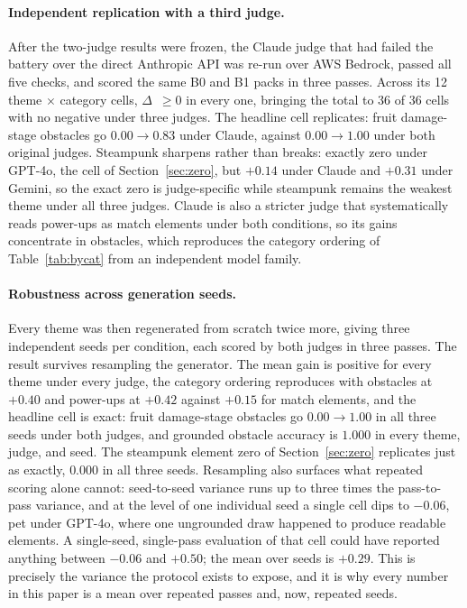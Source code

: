 \documentclass{article}
\newcommand{\D}{\ensuremath{\Delta}}
\begin{document}
\paragraph{Independent replication with a third judge.} After the two-judge results were frozen,
the Claude judge that had failed the battery over the direct Anthropic API was re-run over AWS
Bedrock, passed all five checks, and scored the same B0 and B1 packs in three passes. Across its 12
theme $\times$ category cells, \D~$\geq 0$ in every one, bringing the total to 36 of 36 cells with
no negative under three judges. The headline cell replicates: fruit damage-stage obstacles go
$0.00 \to 0.83$ under Claude, against $0.00 \to 1.00$ under both original judges. Steampunk
sharpens rather than breaks: exactly zero under GPT-4o, the cell of Section~\ref{sec:zero}, but
$+0.14$ under Claude and $+0.31$ under Gemini, so the exact zero is judge-specific while steampunk
remains the weakest theme under all three judges. Claude is also a stricter judge that
systematically reads power-ups as match elements under both conditions, so its gains concentrate in
obstacles, which reproduces the category ordering of Table~\ref{tab:bycat} from an independent
model family.

\paragraph{Robustness across generation seeds.} Every theme was then regenerated from scratch
twice more, giving three independent seeds per condition, each scored by both judges in three
passes. The result survives resampling the generator. The mean gain is positive for every theme
under every judge, the category ordering reproduces with obstacles at $+0.40$ and power-ups at
$+0.42$ against $+0.15$ for match elements, and the headline cell is exact: fruit damage-stage
obstacles go $0.00 \to 1.00$ in all three seeds under both judges, and grounded obstacle accuracy
is $1.000$ in every theme, judge, and seed. The steampunk element zero of Section~\ref{sec:zero}
replicates just as exactly, $0.000$ in all three seeds. Resampling also surfaces what repeated
scoring alone cannot: seed-to-seed variance runs up to three times the pass-to-pass variance, and
at the level of one individual seed a single cell dips to $-0.06$, pet under GPT-4o, where one
ungrounded draw happened to produce readable elements. A single-seed, single-pass evaluation of
that cell could have reported anything between $-0.06$ and $+0.50$; the mean over seeds is
$+0.29$. This is precisely the variance the protocol exists to expose, and it is why every number
in this paper is a mean over repeated passes and, now, repeated seeds.
\end{document}
